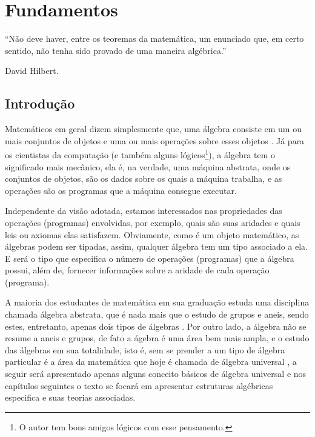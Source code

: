 \chapter{Fundamentos}\label{cap:FundamentsAlgebra}

\epigraph{``Não deve haver, entre os teoremas da matemática, um enunciado que, em certo sentido, não tenha sido provado de uma maneira algébrica.''}{David Hilbert.}

\section{Introdução}\label{sec:IntroAlgebra}


Matemáticos em geral dizem simplesmente que, uma álgebra consiste em um ou mais conjuntos de objetos e uma ou mais operações sobre esses objetos \cite{lang2008}. Já para os cientistas da computação (e também alguns lógicos\footnote{O autor tem bons amigos lógicos com esse pensamento.}), a álgebra tem o significado mais mecânico, ela é, na verdade, uma máquina abstrata, onde os conjuntos de objetos, são os dados sobre os quais a máquina trabalha, e as operações são os programas que a máquina consegue executar.

Independente da visão adotada, estamos interessados nas propriedades das operações (programas) envolvidas, por exemplo, quais são suas aridades e quais leis ou axiomas elas satisfazem. Obviamente, como é um objeto matemático, as álgebras podem ser tipadas, assim, qualquer álgebra tem um tipo associado a ela. E será o tipo que especifica o número de operações (programas) que a álgebra possui, além de, fornecer informações sobre a aridade de cada operação (programa). 

A maioria dos estudantes de matemática em sua graduação estuda uma disciplina chamada álgebra abstrata, que é nada mais que o estudo de grupos e aneis, sendo estes, entretanto, apenas dois tipos de álgebras \cite{stanley1981}. Por outro lado, a álgebra não se resume a aneis e grupos, de fato a ágebra é uma área bem mais ampla, e o estudo das álgebras em sua totalidade, isto é, sem se prender a um tipo de álgebra particular é a área da matemática que hoje é chamada de álgebra universal \cite{klaus2001, benja-Logica}, a seguir será apresentado apenas alguns conceito básicos de álgebra universal e nos capítulos seguintes o texto se focará em apresentar estruturas algébricas especifica e suas teorias associadas.


